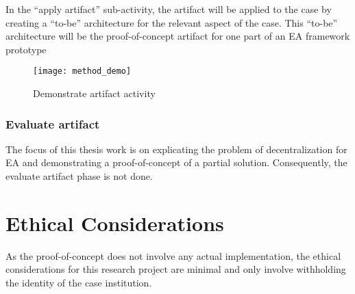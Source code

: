 In the ``apply artifact'' sub-activity, the artifact will be applied to the case by creating a ``to-be'' architecture for the relevant aspect of the case. This ``to-be'' architecture will be the proof-of-concept artifact for one part of an EA framework prototype

\begin{figure}
\centering
\texttt{[image: method\_demo]}
\caption{Demonstrate artifact activity}
\label{fig:method_demo}
\end{figure}

\subsubsection*{Evaluate artifact}

The focus of this thesis work is on explicating the problem of decentralization for EA and demonstrating a proof-of-concept of a partial solution. Consequently, the evaluate artifact phase is not done. 

\section{Ethical Considerations}

As the proof-of-concept does not involve any actual implementation, the ethical considerations for this research project are minimal and only involve withholding the identity of the case institution. 
